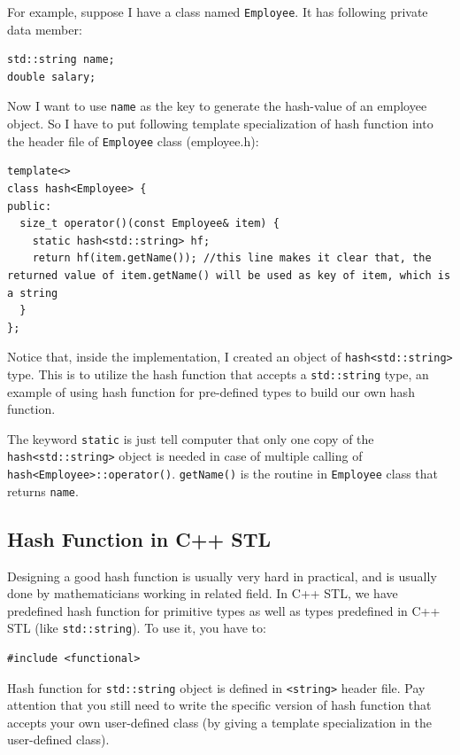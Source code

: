 \documentclass[12pt]{book}
\begin{document}
For example, suppose I have a class named \texttt{Employee}. It has following private data member:
\begin{verbatim}
std::string name;
double salary;
\end{verbatim}

Now I want to use \texttt{name} as the key to generate the hash-value of an employee object. So I have to put following template specialization of hash function into the header file of \texttt{Employee} class (employee.h):
\begin{verbatim}
template<>
class hash<Employee> {
public:
  size_t operator()(const Employee& item) {
    static hash<std::string> hf;
    return hf(item.getName()); //this line makes it clear that, the returned value of item.getName() will be used as key of item, which is a string
  }
};
\end{verbatim}

Notice that, inside the implementation, I created an object of \texttt{hash<std::string>} type. This is to utilize the hash function that accepts a \texttt{std::string} type, an example of using hash function for pre-defined types to build our own hash function.

The keyword \texttt{static} is just tell computer that only one copy of the \texttt{hash<std::string>} object is needed in case of multiple calling of \texttt{hash<Employee>::operator()}. \texttt{getName()} is the routine in \texttt{Employee} class that returns \texttt{name}.


\subsection{Hash Function in C++ STL}
\label{sec:orgef50188}

Designing a good hash function is usually very hard in practical, and is usually done by mathematicians working in related field. In C++ STL, we have predefined hash function for primitive types as well as types predefined in C++ STL (like \texttt{std::string}). To use it, you have to:
\begin{verbatim}
#include <functional>
\end{verbatim}

Hash function for \texttt{std::string} object is defined in \texttt{<string>} header file. Pay attention that you still need to write the specific version of hash function that accepts your own user-defined class (by giving a template specialization in the user-defined class).
\end{document}
